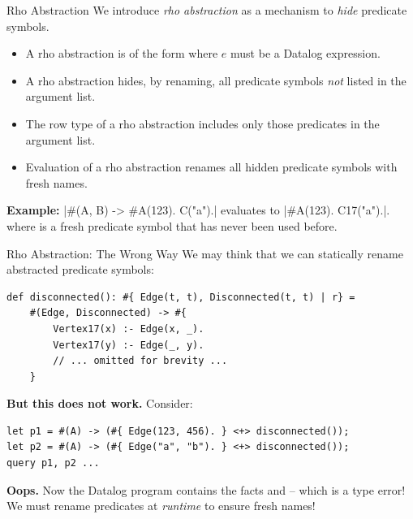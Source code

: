 \begin{frame}[fragile]{Rho Abstraction}
We introduce \emph{rho abstraction} as a mechanism to \emph{hide} predicate symbols.

\small
\begin{itemize}
    \item A rho abstraction is of the form  where $e$ must
    be a Datalog expression.
    \pause \item A rho abstraction hides, by renaming, all predicate symbols \emph{not}
    listed in the argument list. 
    \pause \item The row type of a rho abstraction includes only those predicates in
    the argument list. 
    \pause \item Evaluation of a rho abstraction renames all hidden predicate symbols
    with fresh names. 
\end{itemize}

\pause

\textbf{Example:} \Code|#(A, B) -> #{A(123). C("a").}| evaluates to \Code|#{A(123). C17("a").}|. 
where  is a fresh predicate symbol that has never been used before.
\end{frame}

\begin{frame}[fragile]{Rho Abstraction: The Wrong Way}
We may think that we can statically rename abstracted predicate symbols:

\begin{lstlisting}[language=flix, xleftmargin=0.8cm]
def disconnected(): #{ Edge(t, t), Disconnected(t, t) | r} = 
    #(Edge, Disconnected) -> #{
        Vertex17(x) :- Edge(x, _).
        Vertex17(y) :- Edge(_, y).
        // ... omitted for brevity ...
    }
\end{lstlisting}

\pause

\textbf{But this does not work.} Consider:

\begin{lstlisting}[language=flix, xleftmargin=0.8cm]
let p1 = #(A) -> (#{ Edge(123, 456). } <+> disconnected());
let p2 = #(A) -> (#{ Edge("a", "b"). } <+> disconnected());
query p1, p2 ...
\end{lstlisting}

\textbf{Oops.} Now the Datalog program contains the facts 
and  -- which is a type error! We must rename predicates at
\emph{runtime} to ensure fresh names!
\end{frame}

